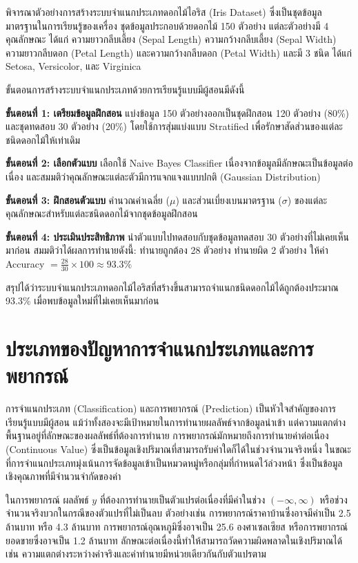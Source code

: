 \begin{exmp}
\label{exmp:supervised_learning_iris}
พิจารณาตัวอย่างการสร้างระบบจำแนกประเภทดอกไม้ไอริส (Iris Dataset) ซึ่งเป็นชุดข้อมูลมาตรฐานในการเรียนรู้ของเครื่อง ชุดข้อมูลประกอบด้วยดอกไม้ 150 ตัวอย่าง แต่ละตัวอย่างมี 4 คุณลักษณะ ได้แก่ ความยาวกลีบเลี้ยง (Sepal Length) ความกว้างกลีบเลี้ยง (Sepal Width) ความยาวกลีบดอก (Petal Length) และความกว้างกลีบดอก (Petal Width) และมี 3 ชนิด ได้แก่ Setosa, Versicolor, และ Virginica

ขั้นตอนการสร้างระบบจำแนกประเภทด้วยการเรียนรู้แบบมีผู้สอนมีดังนี้

\textbf{ขั้นตอนที่ 1: เตรียมข้อมูลฝึกสอน} แบ่งข้อมูล 150 ตัวอย่างออกเป็นชุดฝึกสอน 120 ตัวอย่าง (80\%) และชุดทดสอบ 30 ตัวอย่าง (20\%) โดยใช้การสุ่มแบ่งแบบ Stratified เพื่อรักษาสัดส่วนของแต่ละชนิดดอกไม้ให้เท่าเดิม

\textbf{ขั้นตอนที่ 2: เลือกตัวแบบ} เลือกใช้ Naive Bayes Classifier เนื่องจากข้อมูลมีลักษณะเป็นข้อมูลต่อเนื่อง และสมมติว่าคุณลักษณะแต่ละตัวมีการแจกแจงแบบปกติ (Gaussian Distribution)

\textbf{ขั้นตอนที่ 3: ฝึกสอนตัวแบบ} คำนวณค่าเฉลี่ย ($\mu$) และส่วนเบี่ยงเบนมาตรฐาน ($\sigma$) ของแต่ละคุณลักษณะสำหรับแต่ละชนิดดอกไม้จากชุดข้อมูลฝึกสอน

\textbf{ขั้นตอนที่ 4: ประเมินประสิทธิภาพ} นำตัวแบบไปทดสอบกับชุดข้อมูลทดสอบ 30 ตัวอย่างที่ไม่เคยเห็นมาก่อน สมมติว่าได้ผลการทำนายดังนี้: ทำนายถูกต้อง 28 ตัวอย่าง ทำนายผิด 2 ตัวอย่าง ให้ค่า Accuracy $= \frac{28}{30} \times 100 \approx 93.3\%$

สรุปได้ว่าระบบจำแนกประเภทดอกไม้ไอริสที่สร้างขึ้นสามารถจำแนกชนิดดอกไม้ได้ถูกต้องประมาณ 93.3\% เมื่อพบข้อมูลใหม่ที่ไม่เคยเห็นมาก่อน
\end{exmp}

\section{ประเภทของปัญหาการจำแนกประเภทและการพยากรณ์}
การจำแนกประเภท (Classification) และการพยากรณ์ (Prediction) เป็นหัวใจสำคัญของการเรียนรู้แบบมีผู้สอน แม้ว่าทั้งสองจะมีเป้าหมายในการทำนายผลลัพธ์จากข้อมูลนำเข้า แต่ความแตกต่างพื้นฐานอยู่ที่ลักษณะของผลลัพธ์ที่ต้องการทำนาย การพยากรณ์มักหมายถึงการทำนายค่าต่อเนื่อง (Continuous Value) ซึ่งเป็นข้อมูลเชิงปริมาณที่สามารถรับค่าใดก็ได้ในช่วงจำนวนจริงหนึ่ง ในขณะที่การจำแนกประเภทมุ่งเน้นการจัดข้อมูลเข้าเป็นหมวดหมู่หรือกลุ่มที่กำหนดไว้ล่วงหน้า ซึ่งเป็นข้อมูลเชิงคุณภาพที่มีจำนวนจำกัดของค่า

ในการพยากรณ์ ผลลัพธ์ $y$ ที่ต้องการทำนายเป็นตัวแปรต่อเนื่องที่มีค่าในช่วง $(-\infty, \infty)$ หรือช่วงจำนวนจริงบวกในกรณีของตัวแปรที่ไม่เป็นลบ ตัวอย่างเช่น การพยากรณ์ราคาบ้านซึ่งอาจมีค่าเป็น 2.5 ล้านบาท หรือ 4.3 ล้านบาท การพยากรณ์อุณหภูมิซึ่งอาจเป็น 25.6 องศาเซลเซียส หรือการพยากรณ์ยอดขายซึ่งอาจเป็น 1.2 ล้านบาท ลักษณะต่อเนื่องนี้ทำให้สามารถวัดความผิดพลาดในเชิงปริมาณได้ เช่น ความแตกต่างระหว่างค่าจริงและค่าทำนายมีหน่วยเดียวกันกับตัวแปรตาม

